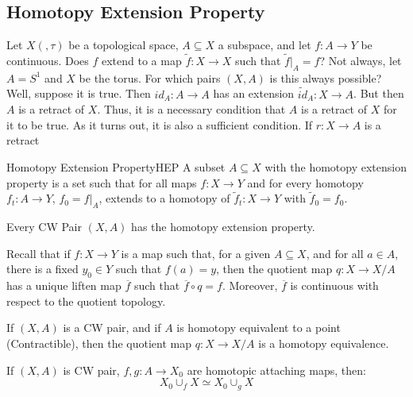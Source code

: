 \documentclass{book}                                                           %
\begin{document}
    \subsection{Homotopy Extension Property}
        Let $X(,\tau)$ be a topological space,
        $A\subseteq{X}$ a subspace, and let
        $f:A\rightarrow{Y}$ be continuous. Does
        $f$ extend to a map $\tilde{f}:X\rightarrow{X}$
        such that $\tilde{f}|_{A}=f$? Not always, let
        $A=S^{1}$ and $X$ be the torus. For which pairs
        $(X,A)$ is this always possible? Well, suppose
        it is true. Then $id_{A}:A\rightarrow{A}$ has
        an extension $\tilde{id}_{A}:X\rightarrow{A}$.
        But then $A$ is a retract of $X$. Thus, it
        is a necessary condition that $A$ is a retract
        of $X$ for it to be true. As it turns out, it is
        also a sufficient condition. If
        $r:X\rightarrow{A}$ is a retract
        \begin{ldefinition}{Homotopy Extension Property}{HEP}
            A subset $A\subseteq{X}$ with the homotopy
            extension property is a set such that for all
            maps $f:X\rightarrow{Y}$ and for every
            homotopy $f_{t}:A\rightarrow{Y}$,
            $f_{0}=f|_{A}$, extends to a homotopy of
            $\tilde{f}_{t}:X\rightarrow{Y}$ with
            $\tilde{f}_{0}=f_{0}$.
        \end{ldefinition}
        \begin{theorem}
            Every CW Pair $(X,A)$ has the homotopy
            extension property.
        \end{theorem}
        Recall that if $f:X\rightarrow{Y}$ is a map such that,
        for a given $A\subseteq{X}$, and for all $a\in{A}$,
        there is a fixed $y_{0}\in{Y}$ such that $f(a)=y$, then
        the quotient map $q:X\rightarrow{X/A}$ has a unique
        liften map $\overline{f}$ such that
        $\overline{f}\circ{q}=f$. Moreover, $\overline{f}$ is
        continuous with respect to the quotient topology.
        \begin{theorem}
            If $(X,A)$ is a CW pair, and if $A$ is
            homotopy equivalent to a point
            (Contractible), then the quotient map
            $q:X\rightarrow{X/A}$ is a homotopy
            equivalence.
        \end{theorem}
        \begin{theorem}
            If $(X,A)$ is CW pair, $f,g:A\rightarrow{X_{0}}$
            are homotopic attaching maps, then:
            \begin{equation}
                X_{0}\cup_{f}X\simeq{X}_{0}\cup_{g}X
            \end{equation}
        \end{theorem}
\end{document}
